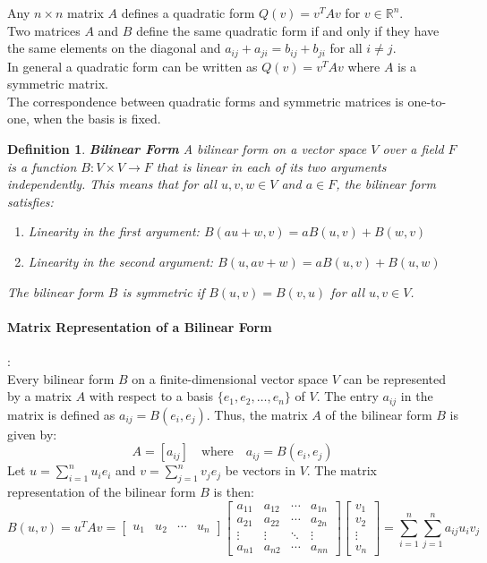 \documentclass[11pt]{book} %
\newtheorem{definition}{Definition}[section]
\begin{document}
Any $n \times n$ matrix $A$ defines a quadratic form $Q(v) = v^T A v$ for $v \in \mathbb{R}^n$.  \\
Two matrices $A$ and $B$ define the same quadratic form if and only if they have the same elements on the diagonal and $a_{ij} + a_{ji} = b_{ij} + b_{ji}$ for all $i \neq j$. \\
In general a quadratic form can be written as $Q(v) = v^T A v$ where $A$ is a symmetric matrix. \\
The correspondence between quadratic forms and symmetric matrices is one-to-one, when the basis is fixed.

\begin{definition}{\textbf{Bilinear Form}}
    A bilinear form on a vector space \( V \) over a field \( F \) is a function \( B: V \times V \to F \) that is linear in each of its two arguments independently. This means that for all \( u, v, w \in V \) and \( a \in F \), the bilinear form satisfies:
    \begin{enumerate}
        \item Linearity in the first argument: \( B(au + w, v) = a B(u, v) + B(w, v) \)
        \item Linearity in the second argument: \( B(u, av + w) = a B(u, v) + B(u, w) \)
    \end{enumerate}
    The bilinear form \( B \) is symmetric if \( B(u, v) = B(v, u) \) for all \( u, v \in V \).
\end{definition}

\paragraph{Matrix Representation of a Bilinear Form}: \\ 
Every bilinear form \( B \) on a finite-dimensional vector space \( V \) can be represented by a matrix \( A \) with respect to a basis 
\( \{e_1, e_2, \dots, e_n\} \) of \( V \). 
The entry \( a_{ij} \) in the matrix is defined as \( a_{ij} = B(e_i, e_j) \). Thus, the matrix \( A \) of the bilinear form \( B \) is given by:
\[
A = [a_{ij}] \quad \text{where} \quad a_{ij} = B(e_i, e_j)
\]
Let \( u = \sum_{i=1}^n u_i e_i \) and \( v = \sum_{j=1}^n v_j e_j \) be vectors in \( V \). The matrix representation of the bilinear form \( B \) is then:
\[
B(u, v) = u^T A v 
= \begin{bmatrix} u_1 & u_2 & \cdots & u_n \end{bmatrix} \begin{bmatrix} a_{11} & a_{12} & \cdots & a_{1n} \\ a_{21} & a_{22} & \cdots & a_{2n} \\ \vdots & \vdots & \ddots & \vdots \\ a_{n1} & a_{n2} & \cdots & a_{nn} \end{bmatrix} \begin{bmatrix} v_1 \\ v_2 \\ \vdots \\ v_n \end{bmatrix}
= \sum_{i=1}^n \sum_{j=1}^n a_{ij} u_i v_j
\]
\end{document}
